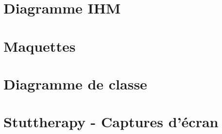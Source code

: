 \begin{appendices}
\chapter{Diagramme IHM}

\chapter{Maquettes}

\chapter{Diagramme de classe}

\chapter{Stuttherapy - Captures d'écran}


\end{appendices}
